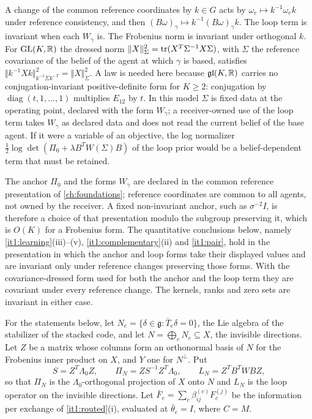 A change of the common reference coordinates by $k\in G$ acts by $\omega_e\mapsto k^{-1}\omega_ek$ under reference consistency, and then $(B\omega)_\gamma\mapsto k^{-1}(B\omega)_\gamma k$. The loop term is invariant when each $W_\gamma$ is. The Frobenius norm is invariant under orthogonal $k$. For $\mathrm{GL}(K,\mathbb R)$ the dressed norm $\Vert X\Vert_\Sigma^2=\operatorname{tr}(X^T\Sigma^{-1}X\Sigma)$, with $\Sigma$ the reference covariance of the belief of the agent at which $\gamma$ is based, satisfies $\Vert k^{-1}Xk\Vert^2_{k^{-1}\Sigma k^{-T}}=\Vert X\Vert^2_\Sigma$. A law is needed here because $\mathfrak{gl}(K,\mathbb R)$ carries no conjugation-invariant positive-definite form for $K\geq2$: conjugation by $\operatorname{diag}(t,1,\ldots,1)$ multiplies $E_{12}$ by $t$. In this model $\Sigma$ is fixed data at the operating point, declared with the form $W_\gamma$; a receiver-owned use of the loop term takes $W_\gamma$ as declared data and does not read the current belief of the base agent. If it were a variable of an objective, the log normalizer $\frac12\log\det(\Pi_0+\lambda B^TW(\Sigma)B)$ of the loop prior would be a belief-dependent term that must be retained.

The anchor $\Pi_0$ and the forms $W_\gamma$ are declared in the common reference presentation of \cref{ch:foundations}; reference coordinates are common to all agents, not owned by the receiver. A fixed non-invariant anchor, such as $\sigma^{-2}I$, is therefore a choice of that presentation modulo the subgroup preserving it, which is $O(K)$ for a Frobenius form. The quantitative conclusions below, namely \cref{it1:learning}(iii)--(v), \cref{it1:complementary}(ii) and \cref{it1:pair}, hold in the presentation in which the anchor and loop forms take their displayed values and are invariant only under reference changes preserving those forms. With the covariance-dressed form used for both the anchor and the loop term they are covariant under every reference change. The kernels, ranks and zero sets are invariant in either case.

For the statements below, let $N_e=\{\delta\in\mathfrak g:\bar T_e\delta=0\}$, the Lie algebra of the stabilizer of the stacked code, and let $N=\bigoplus_eN_e\subseteq X$, the invisible directions. Let $Z$ be a matrix whose columns form an orthonormal basis of $N$ for the Frobenius inner product on $X$, and $Y$ one for $N^\perp$. Put
\begin{equation}
S=Z^T\Lambda_0Z,\qquad
\Pi_N=ZS^{-1}Z^T\Lambda_0,\qquad
L_N=Z^TB^TWBZ,
\label{it1:learning-notation}
\end{equation}
so that $\Pi_N$ is the $\Lambda_0$-orthogonal projection of $X$ onto $N$ and $L_N$ is the loop operator on the invisible directions. Let $\bar F_e=\sum_c\beta^{(c)}_{ij}F_c^{(j)}$ be the information per exchange of \cref{it1:routed}(i), evaluated at $\bar\theta_e=I$, where $C=M$.

